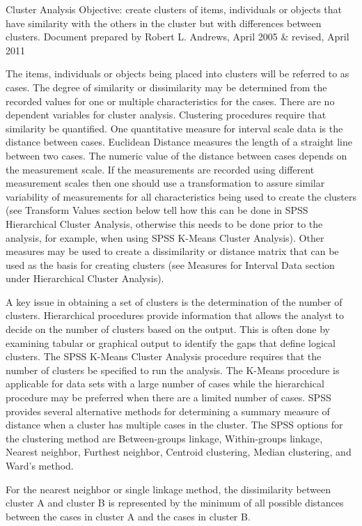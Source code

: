 Cluster Analysis
Objective: create clusters of items, individuals or objects that have similarity with the others in the cluster but with differences between clusters.  
Document prepared by Robert L. Andrews, April 2005 & revised, April 2011

The items, individuals or objects being placed into clusters will be referred to as cases.  The degree of similarity or dissimilarity may be determined from the recorded values for one or multiple characteristics for the cases.  There are no dependent variables for cluster analysis.  Clustering procedures require that similarity be quantified.  One quantitative measure for interval scale data is the distance between cases.  Euclidean Distance measures the length of a straight line between two cases.  The numeric value of the distance between cases depends on the measurement scale.  If the measurements are recorded using different measurement scales then one should use a transformation to assure similar variability of measurements for all characteristics being used to create the clusters (see Transform Values section below tell how this can be done in SPSS Hierarchical Cluster Analysis, otherwise this needs to be done prior to the analysis, for example, when using SPSS K-Means Cluster Analysis).  Other measures may be used to create a dissimilarity or distance matrix that can be used as the basis for creating clusters (see Measures for Interval Data section under Hierarchical Cluster Analysis).  

A key issue in obtaining a set of clusters is the determination of the number of clusters.  Hierarchical procedures provide information that allows the analyst to decide on the number of clusters based on the output.  This is often done by examining tabular or graphical output to identify the gaps that define logical clusters.  The SPSS K-Means Cluster Analysis procedure requires that the number of clusters be specified to run the analysis.  The K-Means procedure is applicable for data sets with a large number of cases while the hierarchical procedure may be preferred when there are a limited number of cases.  SPSS provides several alternative methods for determining a summary measure of distance when a cluster has multiple cases in the cluster.  The SPSS options for the clustering method are Between-groups linkage, Within-groups linkage, Nearest neighbor, Furthest neighbor, Centroid clustering, Median clustering, and Ward's method.

For the nearest neighbor or single linkage method, the dissimilarity between cluster A and cluster B is represented by the minimum of all possible distances between the cases in cluster A and the cases in cluster B.

